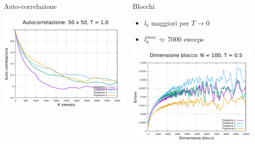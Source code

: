 \begin{frame}
\begin{columns}
\begin{column}{0.33\textwidth}
\begin{block}{Auto-correlazione}
                \vspace{0.5cm}

                \centering
                \includegraphics[width=\textwidth]{Immagini/simXY/auto_50_1.0.pdf}
            
            \end{block}
        \end{column}

        \begin{column}{0.33\textwidth}
            \begin{block}{Blocchi}
                \begin{itemize}[itemsep=0.5em, label=$\diamond$]
                    \item $l_{b}$ maggiori per $T \to 0$
                    \item $l_{b}^{max}\,\simeq\,7000$ sweeps
                \end{itemize}

                \vspace{0.5cm}

                \centering
                \includegraphics[width=\textwidth]{Immagini/simXY/lblk_100_0.5.pdf}


\end{block}
\end{column}
\end{columns}
\end{frame}
